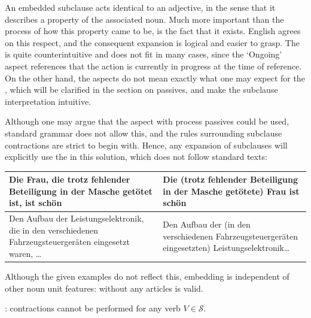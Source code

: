 An embedded subclause acts identical to an adjective, in the sense that it describes a property of the associated noun. Much more important than the process of how this property came to be, is the fact that it exists. English agrees on this respect, and the consequent expansion is  logical and easier to grasp. The  is quite counterintuitive and does not fit in many cases, since the `Ongoing' aspect references that the action is currently in progress at the time of reference. On the other hand, the aspects do not mean exactly what one may expect for the , which will be clarified in the section on passives, and make the subclause interpretation intuitive.

Although one may argue that the  aspect with process passives could be used, standard grammar does not allow this, and the rules surrounding subclause contractions are strict to begin with. Hence, any expansion of  subclauses  will explicitly use the  in this solution, which does not follow standard texts:
\begin{example}
    \begin{tabular}{m{7cm}|m{7cm}}
        Die Frau, die trotz fehlender Beteiligung in der Masche getötet ist, ist schön & Die (trotz fehlender Beteiligung in der Masche getötete) Frau ist schön\\\hline
        Den Aufbau der Leistungselektronik, die in den verschiedenen Fahrzeugsteuergeräten eingesetzt waren, \ldots & Den Aufbau der (in den verschiedenen Fahrzeugsteuergeräten eingesetzten) Leistungselektronik\ldots
    \end{tabular}
\end{example}
Although the given examples do not reflect this, embedding is independent of other noun unit features:  without any articles is valid.

:  contractions cannot be  performed for any verb $V\in\mathcal{S}$.
